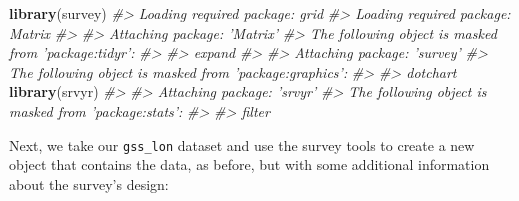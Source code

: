 \documentclass[]{book}
\newenvironment{Shaded}{\begin{snugshade}}{\end{snugshade}}
\newcommand{\CommentTok}[1]{\textcolor[rgb]{0.56,0.35,0.01}{\textit{#1}}}
\newcommand{\DataTypeTok}[1]{\textcolor[rgb]{0.13,0.29,0.53}{#1}}
\newcommand{\DecValTok}[1]{\textcolor[rgb]{0.00,0.00,0.81}{#1}}
\newcommand{\KeywordTok}[1]{\textcolor[rgb]{0.13,0.29,0.53}{\textbf{#1}}}
\newcommand{\NormalTok}[1]{#1}
\newcommand{\OperatorTok}[1]{\textcolor[rgb]{0.81,0.36,0.00}{\textbf{#1}}}
\newcommand{\OtherTok}[1]{\textcolor[rgb]{0.56,0.35,0.01}{#1}}
\newcommand{\StringTok}[1]{\textcolor[rgb]{0.31,0.60,0.02}{#1}}
\begin{document}
\begin{Shaded}
\begin{Highlighting}[]
\KeywordTok{library}\NormalTok{(survey)}
\CommentTok{#> Loading required package: grid}
\CommentTok{#> Loading required package: Matrix}
\CommentTok{#> }
\CommentTok{#> Attaching package: 'Matrix'}
\CommentTok{#> The following object is masked from 'package:tidyr':}
\CommentTok{#> }
\CommentTok{#>     expand}
\CommentTok{#> }
\CommentTok{#> Attaching package: 'survey'}
\CommentTok{#> The following object is masked from 'package:graphics':}
\CommentTok{#> }
\CommentTok{#>     dotchart}
\KeywordTok{library}\NormalTok{(srvyr)}
\CommentTok{#> }
\CommentTok{#> Attaching package: 'srvyr'}
\CommentTok{#> The following object is masked from 'package:stats':}
\CommentTok{#> }
\CommentTok{#>     filter}
\end{Highlighting}
\end{Shaded}

Next, we take our \texttt{gss\_lon} dataset and use the survey tools to create a new object that contains the data, as before, but with some additional information about the survey's design:\\

\begin{Shaded}
\end{Shaded}
\end{document}
